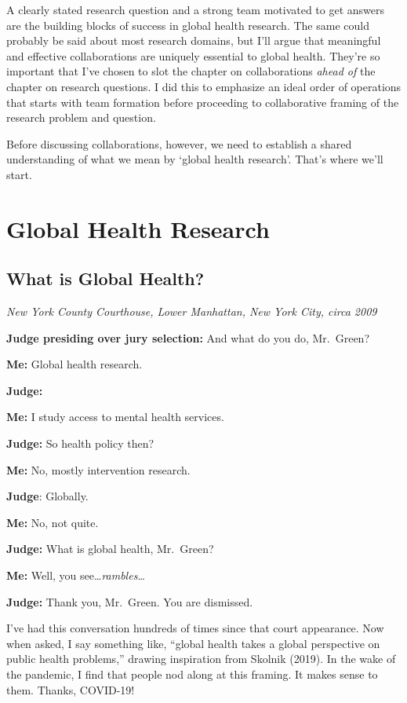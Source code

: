 \documentclass[
  letterpaper,
  DIV=11,
  numbers=noendperiod,
  oneside]{scrreprt}
\begin{document}
A clearly stated research question and a strong team motivated to get
answers are the building blocks of success in global health research.
The same could probably be said about most research domains, but I'll
argue that meaningful and effective collaborations are uniquely
essential to global health. They're so important that I've chosen to
slot the chapter on collaborations \emph{ahead of} the chapter on
research questions. I did this to emphasize an ideal order of operations
that starts with team formation before proceeding to collaborative
framing of the research problem and question.

Before discussing collaborations, however, we need to establish a shared
understanding of what we mean by `global health research'. That's where
we'll start.

\hypertarget{global-health-research}{%
\chapter{Global Health Research}\label{global-health-research}}

\hypertarget{what-is-global-health}{%
\section{What is Global Health?}\label{what-is-global-health}}

\emph{New York County Courthouse, Lower Manhattan, New York City, circa
2009}

\textbf{Judge presiding over jury selection:} And what do you do,
Mr.~Green?

\textbf{Me:} Global health research.

\textbf{Judge:}

\textbf{Me:} I study access to mental health services.

\textbf{Judge:} So health policy then?

\textbf{Me:} No, mostly intervention research.

\textbf{Judge}: Globally.

\textbf{Me:} No, not quite.

\textbf{Judge:} What is global health, Mr.~Green?

\textbf{Me:} Well, you see\ldots{}\emph{rambles}\ldots{}

\textbf{Judge:} Thank you, Mr.~Green. You are dismissed.

I've had this conversation hundreds of times since that court
appearance. Now when asked, I say something like, ``global health takes
a global perspective on public health problems,'' drawing inspiration
from Skolnik
(2019).
In the wake of the pandemic, I find that people nod along at this
framing. It makes sense to them. Thanks, COVID-19!
\end{document}
